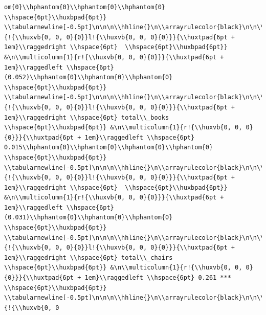 \documentclass[11pt,preprint, authoryear]{elsarticle}
\numberwithin{equation}{section}
\numberwithin{figure}{section}
\numberwithin{table}{section}
\begin{document}
\begin{verbatim}
om{0}\\hphantom{0}\\hphantom{0}\\hphantom{0} \\hspace{6pt}\\huxbpad{6pt}} \\tabularnewline[-0.5pt]\n\n\n\\hhline{}\n\\arrayrulecolor{black}\n\n\\multicolumn{1}{!{\\huxvb{0, 0, 0}{0}}l!{\\huxvb{0, 0, 0}{0}}}{\\huxtpad{6pt + 1em}\\raggedright \\hspace{6pt}  \\hspace{6pt}\\huxbpad{6pt}} &\n\\multicolumn{1}{r!{\\huxvb{0, 0, 0}{0}}}{\\huxtpad{6pt + 1em}\\raggedleft \\hspace{6pt} (0.052)\\hphantom{0}\\hphantom{0}\\hphantom{0} \\hspace{6pt}\\huxbpad{6pt}} \\tabularnewline[-0.5pt]\n\n\n\\hhline{}\n\\arrayrulecolor{black}\n\n\\multicolumn{1}{!{\\huxvb{0, 0, 0}{0}}l!{\\huxvb{0, 0, 0}{0}}}{\\huxtpad{6pt + 1em}\\raggedright \\hspace{6pt} total\\_books \\hspace{6pt}\\huxbpad{6pt}} &\n\\multicolumn{1}{r!{\\huxvb{0, 0, 0}{0}}}{\\huxtpad{6pt + 1em}\\raggedleft \\hspace{6pt} 0.015\\hphantom{0}\\hphantom{0}\\hphantom{0}\\hphantom{0} \\hspace{6pt}\\huxbpad{6pt}} \\tabularnewline[-0.5pt]\n\n\n\\hhline{}\n\\arrayrulecolor{black}\n\n\\multicolumn{1}{!{\\huxvb{0, 0, 0}{0}}l!{\\huxvb{0, 0, 0}{0}}}{\\huxtpad{6pt + 1em}\\raggedright \\hspace{6pt}  \\hspace{6pt}\\huxbpad{6pt}} &\n\\multicolumn{1}{r!{\\huxvb{0, 0, 0}{0}}}{\\huxtpad{6pt + 1em}\\raggedleft \\hspace{6pt} (0.031)\\hphantom{0}\\hphantom{0}\\hphantom{0} \\hspace{6pt}\\huxbpad{6pt}} \\tabularnewline[-0.5pt]\n\n\n\\hhline{}\n\\arrayrulecolor{black}\n\n\\multicolumn{1}{!{\\huxvb{0, 0, 0}{0}}l!{\\huxvb{0, 0, 0}{0}}}{\\huxtpad{6pt + 1em}\\raggedright \\hspace{6pt} total\\_chairs \\hspace{6pt}\\huxbpad{6pt}} &\n\\multicolumn{1}{r!{\\huxvb{0, 0, 0}{0}}}{\\huxtpad{6pt + 1em}\\raggedleft \\hspace{6pt} 0.261 *** \\hspace{6pt}\\huxbpad{6pt}} \\tabularnewline[-0.5pt]\n\n\n\\hhline{}\n\\arrayrulecolor{black}\n\n\\multicolumn{1}{!{\\huxvb{0, 0
\end{verbatim}
\end{document}
